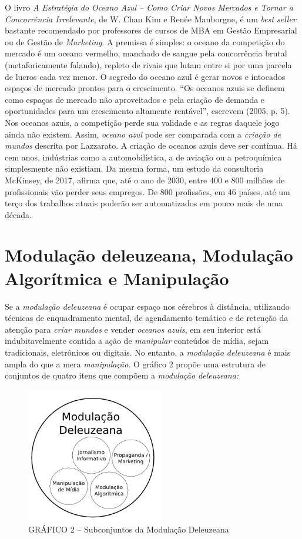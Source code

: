 O livro \emph{A Estratégia do Oceano Azul -- Como Criar Novos Mercados e
Tornar a Concorrência Irrelevante}, de W. Chan Kim e Renée Mauborgne, é
um \emph{best seller} bastante recomendado por professores de cursos de
MBA em Gestão Empresarial ou de Gestão de \emph{Marketing}. A premissa é
simples: o oceano da competição do mercado é um oceano vermelho,
manchado de sangue pela concorrência brutal (metaforicamente falando),
repleto de rivais que lutam entre si por uma parcela de lucros cada vez
menor. O segredo do oceano azul é gerar novos e intocados espaços de
mercado prontos para o crescimento. ``Os oceanos azuis se definem como
espaços de mercado não aproveitados e pela criação de demanda e
oportunidades para um crescimento altamente rentável'', escrevem (2005,
p. 5). Nos oceanos azuis, a competição perde sua validade e as regras
daquele jogo ainda não existem. Assim, \emph{oceano azul} pode ser
comparada com a \emph{criação de mundos} descrita por Lazzarato. A
criação de oceanos azuis deve ser contínua. Há cem anos, indústrias como
a automobilística, a de aviação ou a petroquímica simplesmente não
existiam. Da mesma forma, um estudo da consultoria McKinsey, de 2017,
afirma que, até o ano de 2030, entre 400 e 800 milhões de profissionais
vão perder seus empregos. De 800 profissões, em 46 países, até um terço
dos trabalhos atuais poderão ser automatizados em pouco mais de uma
década.

\section{Modulação deleuzeana, Modulação Algorítmica e Manipulação}

Se a \emph{modulação deleuzeana} é ocupar espaço nos cérebros à
distância, utilizando técnicas de enquadramento mental, de agendamento
temático e de retenção da atenção para \emph{criar mundos} e vender
\emph{oceanos azuis}, em seu interior está indubitavelmente contida a
ação de \emph{manipular} conteúdos de mídia, sejam tradicionais,
eletrônicos ou digitais. No entanto, a \emph{modulação deleuzeana} é
mais ampla do que a mera \emph{manipulação}. O gráfico 2 propõe uma
estrutura de conjuntos de quatro itens que compõem a \emph{modulação
deleuzeana:}



\begin{figure}[!ht]
  \includegraphics[width=60mm]{./imgs/grafico2.png}
\caption{GRÁFICO 2 -- Subconjuntos da Modulação Deleuzeana}
 \end{figure}


